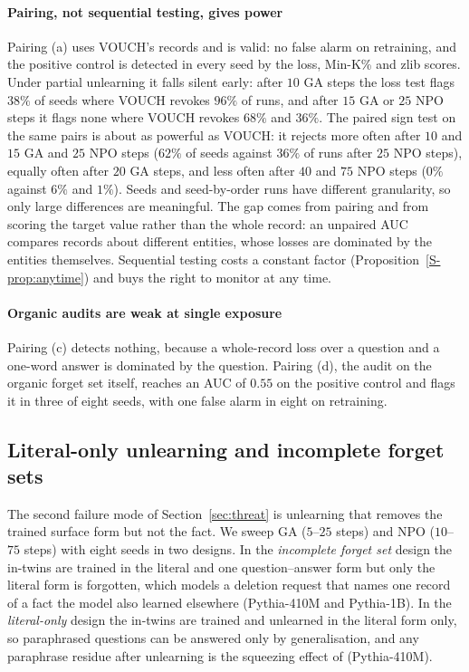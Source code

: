 \paragraph{Pairing, not sequential testing, gives power} Pairing (a) uses VOUCH's records and is
valid: no false alarm on retraining, and the positive control is detected in every seed by the
loss, Min-K\% and zlib scores. Under partial unlearning it falls silent early: after $10$ GA
steps the loss test flags $38\%$ of seeds where VOUCH revokes $96\%$ of runs, and after $15$
GA or $25$ NPO steps it flags none where VOUCH revokes $68\%$ and $36\%$. The paired sign test
on the same pairs is about as powerful as VOUCH: it rejects more often after $10$ and $15$ GA
and $25$ NPO steps ($62\%$ of seeds against $36\%$ of runs after $25$ NPO steps), equally
often after $20$ GA steps, and less often after $40$ and $75$ NPO steps ($0\%$ against $6\%$
and $1\%$). Seeds and seed-by-order runs have different granularity, so only large
differences are meaningful. The gap comes from pairing and from scoring the target value
rather than the whole record: an unpaired AUC compares records about different entities, whose
losses are dominated by the entities themselves. Sequential testing costs a constant factor
(Proposition~\ref{S-prop:anytime}) and buys the right to monitor at any time.

\paragraph{Organic audits are weak at single exposure} Pairing (c) detects nothing, because a
whole-record loss over a question and a one-word answer is dominated by the question. Pairing
(d), the audit on the organic forget set itself, reaches an AUC of $0.55$ on the positive
control and flags it in three of eight seeds, with one false alarm in eight on retraining.

\subsection{Literal-only unlearning and incomplete forget sets}\label{sec:exp-squeeze}

The second failure mode of Section~\ref{sec:threat} is unlearning that removes the trained
surface form but not the fact. We sweep GA ($5$--$25$ steps) and NPO ($10$--$75$ steps) with
eight seeds in two designs. In the \emph{incomplete forget set} design the in-twins are
trained in the literal and one question--answer form but only the literal form is forgotten,
which models a deletion request that names one record of a fact the model also learned
elsewhere (Pythia-410M and Pythia-1B). In the \emph{literal-only} design the in-twins are
trained and unlearned in the literal form only, so paraphrased questions can be answered only
by generalisation, and any paraphrase residue after unlearning is the squeezing effect of
\citet{li2026beliefs} (Pythia-410M).

